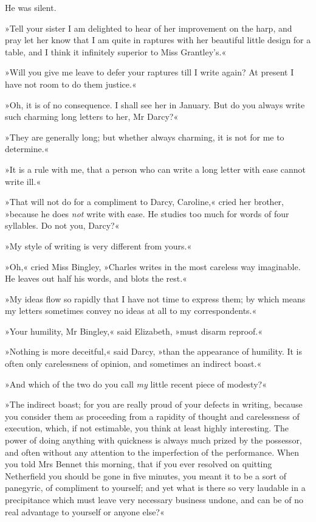 He was silent.

»Tell your sister I am delighted to hear of her improvement on the harp, and pray let her know that I am quite in raptures with her beautiful little design for a table, and I think it infinitely superior to Miss Grantley's.«

»Will you give me leave to defer your raptures till I write again? At present I have not room to do them justice.«

»Oh, it is of no consequence. I shall see her in January. But do you always write such charming long letters to her, Mr Darcy?«

»They are generally long; but whether always charming, it is not for me to determine.«

»It is a rule with me, that a person who can write a long letter with ease cannot write ill.«

»That will not do for a compliment to Darcy, Caroline,« cried her brother, »because he does \textit{not} write with ease. He studies too much for words of four syllables. Do not you, Darcy?«

»My style of writing is very different from yours.«

»Oh,« cried Miss Bingley, »Charles writes in the most careless way imaginable. He leaves out half his words, and blots the rest.«

»My ideas flow so rapidly that I have not time to express them; by which means my letters sometimes convey no ideas at all to my correspondents.«

»Your humility, Mr Bingley,« said Elizabeth, »must disarm reproof.«

»Nothing is more deceitful,« said Darcy, »than the appearance of humility. It is often only carelessness of opinion, and sometimes an indirect boast.«

»And which of the two do you call \textit{my} little recent piece of modesty?«

»The indirect boast; for you are really proud of your defects in writing, because you consider them as proceeding from a rapidity of thought and carelessness of execution, which, if not estimable, you think at least highly interesting. The power of doing anything with quickness is always much prized by the possessor, and often without any attention to the imperfection of the performance. When you told Mrs Bennet this morning, that if you ever resolved on quitting Netherfield you should be gone in five minutes, you meant it to be a sort of panegyric, of compliment to yourself; and yet what is there so very laudable in a precipitance which must leave very necessary business undone, and can be of no real advantage to yourself or anyone else?«

